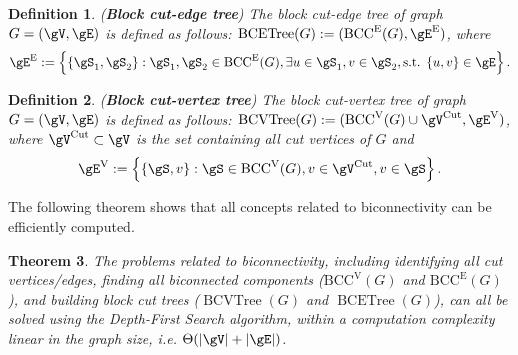 \documentclass{article} %
\newtheorem{theorem}{Theorem}[section]
\newtheorem{definition}[theorem]{Definition}
\begin{document}
\begin{definition}
\label{def:bcetree}
\normalfont (\textbf{Block cut-edge tree}) The block cut-edge tree of graph $G=(\gV,\gE)$ is defined as follows: $\operatorname{BCETree}(G):=(\mathrm{BCC}^\mathrm{E}(G),\gE^\mathrm{E})$, where
\begin{equation*}
\setlength{\abovedisplayskip}{2pt}
\setlength{\belowdisplayskip}{0pt}
    \gE^\mathrm{E}:=\left\{\{\gS_1,\gS_2\}:\gS_1,\gS_2\in\mathrm{BCC}^\mathrm{E}(G),\exists u\in\gS_1,v\in\gS_2,\text{s.t. }\{u,v\}\in\gE\right\}.
\end{equation*}
\end{definition}
\begin{definition}
\label{def:bcvtree}
\normalfont (\textbf{Block cut-vertex tree}) The block cut-vertex tree of graph $G=(\gV,\gE)$ is defined as follows: $\operatorname{BCVTree}(G):=(\mathrm{BCC}^\mathrm{V}(G)\cup\gV^\mathrm{Cut},\gE^\mathrm{V})$, where $\gV^\mathrm{Cut}\subset\gV$ is the set containing all cut vertices of $G$ and
\begin{equation*}
\setlength{\abovedisplayskip}{0pt}
\setlength{\belowdisplayskip}{0pt}
    \gE^\mathrm{V}:=\left\{\{\gS,v\}:\gS\in\mathrm{BCC}^\mathrm{V}(G),v\in\gV^\mathrm{Cut},v\in\gS\right\}.
\end{equation*}
\end{definition}
\vspace{-5pt}

The following theorem shows that all concepts related to biconnectivity can be efficiently computed.

\begin{theorem}
\label{thm:tarjan}
\citep{tarjan1972depth} The problems related to biconnectivity, including identifying all cut vertices/edges, finding all biconnected components ($\mathrm{BCC}^\mathrm{V}(G)$ and $\mathrm{BCC}^\mathrm{E}(G)$), and building block cut trees ($\operatorname{BCVTree}(G)$ and $\operatorname{BCETree}(G)$), can all be solved using the Depth-First Search algorithm, within a computation complexity linear in the graph size, i.e. $\Theta(|\gV|+|\gE|)$.
\end{theorem}

\vspace{-4pt}
\end{document}
